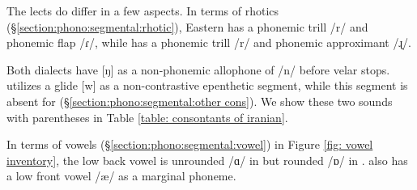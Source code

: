 The lects do differ in a few   aspects. In terms of rhotics (\S\ref{section:phono:segmental:rhotic}), Eastern has a phonemic trill /{r}/ and phonemic flap /{ɾ}/, while {\iaIA} has a phonemic trill /r/ and phonemic approximant /{ɻ}/. 

Both dialects have [ŋ] as a non-phonemic allophone of /n/ before velar stops. {\iaIA} utilizes a glide [{w}] as a non-contrastive epenthetic segment, while this segment is absent for {\seaSE} (\S\ref{section:phono:segmental:other cons}). We show these two sounds with parentheses in Table \ref{table: consontants of iranian}.  







In terms of vowels (\S\ref{section:phono:segmental:vowel}) in Figure \ref{fig: vowel inventory}, the low back vowel is unrounded /{ɑ}/ in {\seaSE} but rounded /{ɒ}/ in {\iaIA}. {\iaIA} also has a  low front vowel /{æ}/ as a marginal phoneme. 


